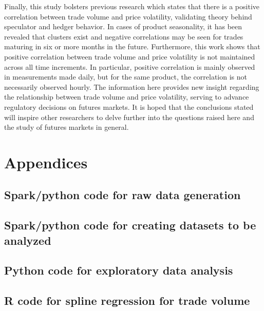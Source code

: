 \documentclass[12pt]{article}
\begin{document}
Finally, this study bolsters previous research which states that there is a positive correlation between trade volume and price volatility, validating theory behind speculator and hedger behavior. In cases of product seasonality, it has been revealed that clusters exist and negative correlations may be seen for trades maturing in six or more months in the future. Furthermore, this work shows that positive correlation between trade volume and price volatility is not maintained across all time increments. In particular, positive correlation is mainly observed in measurements made daily, but for the same product, the correlation is not necessarily observed hourly. The information here provides new insight regarding the relationship between trade volume and price volatility, serving to advance regulatory decisions on futures markets. It is hoped that the conclusions stated will inspire other researchers to delve further into the questions raised here and the study of futures markets in general. 
\newpage

\singlespacing
\section*{Appendices} %
\appendix
\renewcommand\thesubsection{\thesection\Alph{subsection}:}
	\subsection{Spark/python code for raw data generation} 
		\label{app:Code1} 
		
		\newpage	
	\subsection{Spark/python code for creating datasets to be analyzed} 
		\label{app:Code2}
		
		\newpage		
	\subsection{Python code for exploratory data analysis} 
		\label{app:Code3}
		
		\newpage		
	\subsection{R code for spline regression for trade volume}
	 	\label{app:Code4}
	 	
	 	\newpage	 	
\end{document}
